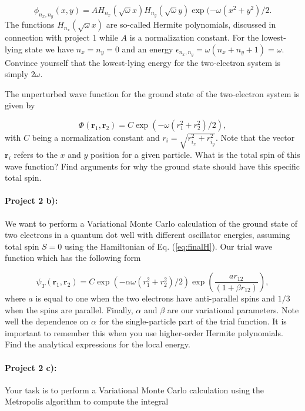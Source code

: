 \documentclass[%
oneside,                 %
final,                   %
10pt]{article}
\begin{document}
\begin{equation*}
\phi_{n_x,n_y}(x,y) = A H_{n_x}(\sqrt{\omega}x)H_{n_y}(\sqrt{\omega}y)\exp{(-\omega(x^2+y^2)/2}.
\end{equation*}
The functions $H_{n_x}(\sqrt{\omega}x)$ are so-called Hermite polynomials, discussed in connection with project 1  while $A$ is a normalization constant. 
For the lowest-lying state we have $n_x=n_y=0$ and an energy $\epsilon_{n_x,n_y}=\omega(n_x+n_y+1) = \omega$.
Convince yourself that the lowest-lying energy for the two-electron system  is simply $2\omega$.

The unperturbed wave function for the ground state of the two-electron system is given by

\begin{equation*}
\Phi(\bm{r}_1,\bm{r}_2) = C\exp{\left(-\omega(r_1^2+r_2^2)/2\right)},
\end{equation*}
with $C$ being a normalization constant and $r_i = \sqrt{r_{i_x}^2+r_{i_y}^2}$. Note that the vector $\bm{r}_i$ 
refers to the $x$ and $y$ position for a given particle.
What is the total spin of this wave function? Find arguments for why the ground state should have
this specific total spin. 

\paragraph{Project 2 b):}
We want to perform  a Variational Monte Carlo calculation of the ground state of two electrons in a quantum dot well with different oscillator energies, assuming total spin $S=0$ using the Hamiltonian of
Eq. (\ref{eq:finalH}). 
Our trial wave function which has the following form

\begin{equation}
   \psi_{T}(\bm{r}_1,\bm{r}_2) = 
   C\exp{\left(-\alpha\omega(r_1^2+r_2^2)/2\right)}
   \exp{\left(\frac{ar_{12}}{(1+\beta r_{12})}\right)}, 
\label{eq:trial}
\end{equation}
where $a$ is equal to one when the two electrons have anti-parallel spins and $1/3$ when the spins are parallel. Finally, $\alpha$ and $\beta$ are our variational parameters. Note well the dependence on $\alpha$ for the single-particle part of the trial function. It is important to remember this when you use higher-order Hermite polynomials.
Find the analytical expressions for the local energy.


\paragraph{Project 2 c):}
Your task is to perform a Variational Monte Carlo calculation
using the Metropolis algorithm to compute the integral
\end{document}
